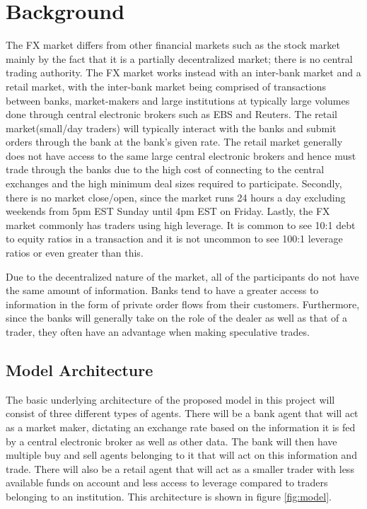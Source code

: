 \chapter{Background}
The FX market differs from other financial markets such as the stock market mainly by the fact that it is a partially decentralized market; there is no central trading authority. The FX market works instead with an inter-bank market and a retail market, with the inter-bank market being comprised of transactions between banks, market-makers and large institutions at typically large volumes done through central electronic brokers such as EBS and Reuters. The retail market(small/day traders) will typically interact with the banks and submit orders through the bank at the bank's given rate. The retail market generally does not have access to the same large central electronic brokers and hence must trade through the banks due to the high cost of 	connecting to the central exchanges and the high minimum deal sizes required to participate. Secondly, there is no market close/open, since the market runs 24 hours a day excluding weekends from 5pm EST Sunday until 4pm EST on Friday. Lastly, the FX market commonly has traders using high leverage. It is common to see 10:1 debt to equity ratios in a transaction and it is not uncommon to see 100:1 leverage ratios or even greater than this\cite{leverage}.
	
Due to the decentralized nature of the market, all of the participants do not have the same amount of information. Banks tend to have a greater access to information in the form of private order flows from their customers. Furthermore, since the banks will generally take on the role of the dealer as well as that of a trader, they often have an advantage when making speculative trades.

\section{Model Architecture}
The basic underlying architecture of the proposed model in this project will consist of three different types of agents. There will be a bank agent that will act as a market maker, dictating an exchange rate based on the information it is fed by a central electronic broker as well as other data. The bank will then have multiple buy and sell agents belonging to it that will act on this information and trade. There will also be a retail agent that will act as a smaller trader with less available funds on account and less access to leverage compared to traders belonging to an institution. This architecture is shown in figure \ref{fig:model}.\\

